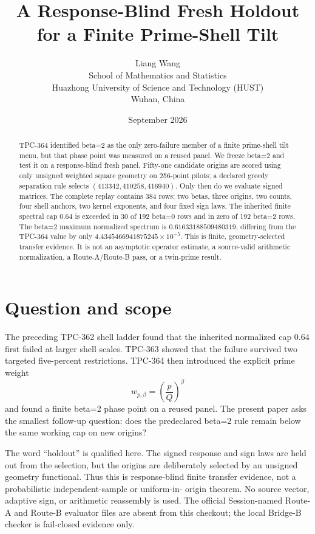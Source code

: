 \documentclass[10pt]{article}
\title{A Response-Blind Fresh Holdout for a Finite Prime-Shell Tilt}
\author{Liang Wang\\
\small School of Mathematics and Statistics\\
\small Huazhong University of Science and Technology (HUST)\\
\small Wuhan, China}
\date{September 2026}
\begin{document}
\maketitle

\begin{abstract}
TPC-364 identified beta=2 as the only zero-failure member of a finite
prime-shell tilt menu, but that phase point was measured on a reused panel.
We freeze beta=2 and test it on a response-blind fresh panel.  Fifty-one
candidate origins are scored using only unsigned weighted square geometry on
256-point pilots; a declared greedy separation rule selects
$(413342,410258,416940)$.  Only then do we evaluate signed matrices.  The
complete replay contains 384 rows: two betas, three origins, two counts, four
shell anchors, two kernel exponents, and four fixed sign laws.  The inherited
finite spectral cap $0.64$ is exceeded in 30 of 192 beta=0 rows and in zero
of 192 beta=2 rows.  The beta=2 maximum normalized spectrum is
$0.61633188509480319$, differing from the TPC-364 value by only
$4.4345466941875245\times10^{-5}$.  This is finite, geometry-selected
transfer evidence.  It is not an asymptotic operator estimate, a
source-valid arithmetic normalization, a Route-A/Route-B pass, or a
twin-prime result.
\end{abstract}

\section{Question and scope}

The preceding TPC-362 shell ladder found that the inherited normalized cap
$0.64$ first failed at larger shell scales.  TPC-363 showed that the failure
survived two targeted five-percent restrictions.  TPC-364 then introduced
the explicit prime weight
\begin{equation}
        w_{p,\beta}=\left(\frac pQ\right)^\beta
\end{equation}
and found a finite beta=2 phase point on a reused panel.  The present paper
asks the smallest follow-up question: does the predeclared beta=2 rule remain
below the same working cap on new origins?

The word ``holdout'' is qualified here.  The signed response and sign laws
are held out from the selection, but the origins are deliberately selected
by an unsigned geometry functional.  Thus this is response-blind finite
transfer evidence, not a probabilistic independent-sample or uniform-in-
origin theorem.  No source vector, adaptive sign, or arithmetic reassembly
is used.  The official Session-named Route-A and Route-B evaluator files are
absent from this checkout; the local Bridge-B checker is fail-closed evidence
only.
\end{document}
